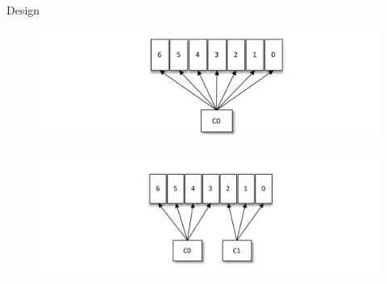 \begin{frame}[plain,t]{Design} %
     \\
     \begin{figure}
        \centering
        \includegraphics[width=0.9\linewidth]{image/0206}
        \label{fig:0206}
    \end{figure}
\vspace{-2ex}
 \begin{figure}
    \centering
    \includegraphics[width=0.9\linewidth]{image/0207}
    \label{fig:0207}
\end{figure}

    
    
    
\end{frame}
